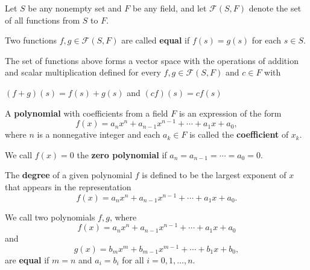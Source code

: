 \begin{definition}
    Let \( S \) be any nonempty set and \( F  \) be any field, and let \( \mathcal{F}(S,F) \) denote the set of all functions from \( S  \) to \( F  \).
\end{definition}

\begin{definition}
    Two functions \( f,g \in \mathcal{F}(S,F)  \) are called \textbf{equal} if \( f(s) = g(s) \) for each \( s \in S  \). 
\end{definition}

The set of functions above forms a vector space with the operations of addition and scalar multiplication defined for every \( f,g \in \mathcal{F}(S,F) \) and \( c \in F  \) with 
\begin{center}
    \( (f+g)(s) = f(s) + g(s)  \) and \( (cf)(s) = cf(s)  \)
\end{center}

\begin{definition}
    A \textbf{polynomial} with coefficients from a field \( F  \) is an expression of the form 
    \[  f(x) = a_{n} x^{n} + a_{n-1} x^{n-1} + \cdots + a_{1} x + a_{0}, \]
    where \( n  \) is a nonnegative integer and each \( a_{k } \in F   \) is called the \textbf{coefficient } of \( x_{k }  \).
\end{definition}

\begin{definition}
    We call \( f(x) = 0  \) the \textbf{zero polynomial} if \( a_{n} = a_{n-1} = \cdots = a_{0} = 0  \).
\end{definition}

\begin{definition}[Degree]
    The \textbf{degree} of a given polynomial \( f  \) is defined to be the largest exponent of \( x  \) that appears in the representation
    \[  f(x) = a_n x^{n} + a_{n-1} x^{n-1} + \cdots + a_{1}x + a_{0}.  \]
\end{definition}

\begin{definition}
    We call two polynomials \( f,g  \), where 
    \[ f(x) = a_n x^{n} +  a_{n-1} x^{n-1} + \cdots + a_{1}x + a_{0}   \] and 
    \[  g(x) = b_m x^{m} + b_{m-1} x^{m-1} + \cdots + b_{1}x + b_{0}, \]
    are \textbf{equal} if \( m =n  \) and \( a_{i} = b_{i}  \) for all \( i = 0,1, \dots , n  \).
\end{definition}


